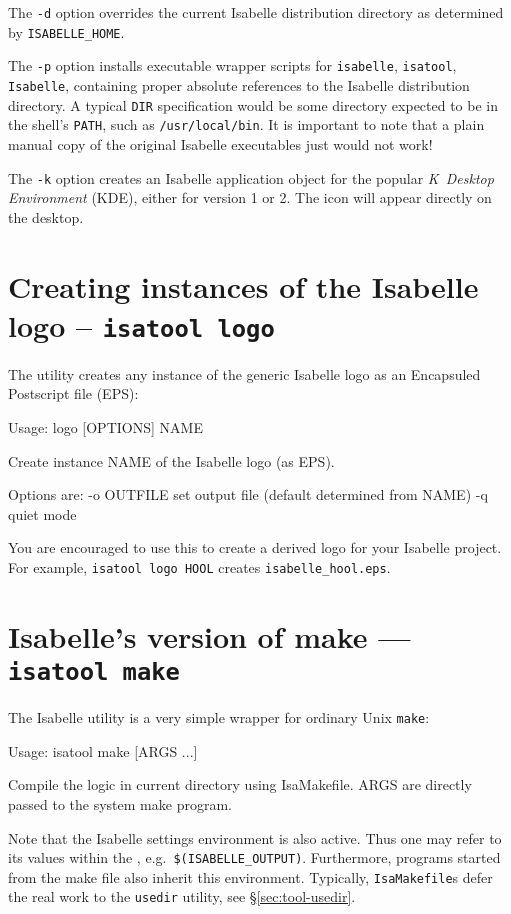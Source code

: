 The \texttt{-d} option overrides the current Isabelle distribution directory
as determined by \texttt{ISABELLE_HOME}.

The \texttt{-p} option installs executable wrapper scripts for
\texttt{isabelle}, \texttt{isatool}, \texttt{Isabelle}, containing proper
absolute references to the Isabelle distribution directory.  A typical
\texttt{DIR} specification would be some directory expected to be in the
shell's \texttt{PATH}, such as \texttt{/usr/local/bin}.  It is important to
note that a plain manual copy of the original Isabelle executables just would
not work!

The \texttt{-k} option creates an Isabelle application object for the popular
\textsl{K~Desktop Environment} (KDE), either for version 1 or 2.
The icon will appear directly on the desktop.


\section{Creating instances of the Isabelle logo -- \texttt{isatool
    logo}}

The  utility creates any instance of the generic Isabelle logo as
an Encapsuled Postscript file (EPS):
\begin{ttbox}
Usage: logo [OPTIONS] NAME

  Create instance NAME of the Isabelle logo (as EPS).

  Options are:
    -o OUTFILE   set output file (default determined from NAME)
    -q           quiet mode
\end{ttbox}
You are encouraged to use this to create a derived logo for your Isabelle
project.  For example, \texttt{isatool logo HOOL} creates
\texttt{isabelle_hool.eps}.


\section{Isabelle's version of make --- \texttt{isatool make}}
\label{sec:tool-make}

The Isabelle  utility is a very simple wrapper for
ordinary Unix \texttt{make}:
\begin{ttbox}
Usage: isatool make [ARGS ...]

  Compile the logic in current directory using IsaMakefile.
  ARGS are directly passed to the system make program.
\end{ttbox}
Note that the Isabelle settings environment is also active. Thus one
may refer to its values within the , e.g.\ 
\texttt{\$(ISABELLE_OUTPUT)}. Furthermore, programs started from the
make file also inherit this environment.  Typically,
\texttt{IsaMakefile}s defer the real work to the \texttt{usedir}
utility, see \S\ref{sec:tool-usedir}.


